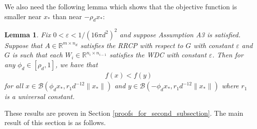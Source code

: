 \documentclass[11pt]{article}
\renewcommand{\epsilon}{\varepsilon}
\newcommand{\R}{\mathbb{R}}
\newcommand{\G}{G}
\newtheorem{lem}{Lemma}
\theoremstyle{remark}
\begin{document}
\noindent We also need the following lemma which shows that the objective function is smaller near $x_*$ than near $-\rho_d x_*$:

\begin{lem} \label{obj_function_bigger_near_negmult} Fix $0 < \epsilon < 1/(16\pi d^2)^2$ and suppose Assumption A3 is satisfied. Suppose that $A \in \R^{m \times n_d}$ satisfies the RRCP with respect to $\G$ with constant $\epsilon$ and $\G$ is such that each $W_i \in \R^{n_i \times n_{i-1}}$ satisfies the WDC with constant $\epsilon$. Then for any $\phi_d \in [\rho_d,1]$, we have that \begin{align}
    f(x) < f(y) \label{tweakbound}
\end{align} for all $x \in \mathcal{B}(\phi_d x_*, r_1d^{-12}\|x_*\|)$ and $y \in \mathcal{B}(-\phi_d x_*, r_1d^{-12}\|x_*\|)$ where $r_1$ is a universal constant.
\end{lem}

\noindent These results are proven in Section \ref{proofs_for_second_subsection}. The main result of this section is as follows.
\end{document}
